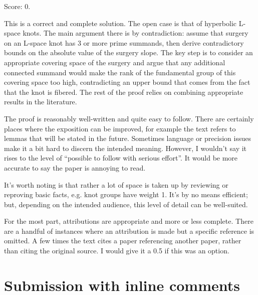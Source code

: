 \documentclass[11pt]{article}
\theoremstyle{definition}
\theoremstyle{remark}
\begin{document}
\noindent Score: 0.

This is a correct and complete solution. The open case is that of hyperbolic L-space knots. The main argument there is by contradiction: assume that surgery on an L-space knot has 3 or more prime summands, then derive contradictory bounds on the absolute value of the surgery slope. The key step is to consider an appropriate covering space of the surgery and argue that any additional connected summand would make the rank of the fundamental group of this covering space too high, contradicting an upper bound that comes from the fact that the knot is fibered. The rest of the proof relies on combining appropriate results in the literature. 

The proof is reasonably well-written and quite easy to follow. There are certainly places where the exposition can be improved, for example the text refers to lemmas that will be stated in the future. Sometimes language or precision issues make it a bit hard to discern the intended meaning. However, I wouldn't say it rises to the level of  ``possible to follow with serious effort''. It would be more accurate to say the paper is annoying to read.

It's worth noting is that rather a lot of space is taken up by reviewing or reproving basic facts, e.g. knot groups have weight 1. It's by no means efficient; but, depending on the intended audience, this level of detail can be well-suited. 

For the most part, attributions are appropriate and more or less complete. There are a handful of instances where an attribution is made but a specific reference is omitted. A few times the text cites a paper referencing another paper, rather than citing the original source.  I would give it a 0.5 if this was an option.

\newpage
\section{Submission with inline comments}
\end{document}
